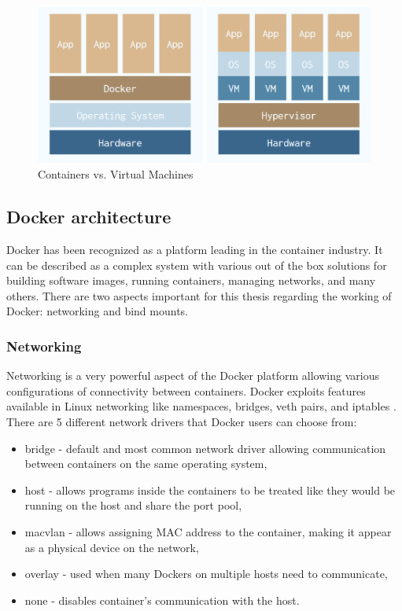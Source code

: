 \documentclass[english]{kththesis}
\begin{document}
\begin{figure}[!ht]
  \centering
    \includegraphics[width=1\textwidth]{Fig2}
  \caption{Containers vs. Virtual Machines}
  \label{fig:containerVM}
\end{figure}

\subsection{Docker architecture}
Docker has been recognized as a platform leading in the container industry. It can be described as a complex system with various out of the box solutions for building software images, running containers, managing networks, and many others. There are two aspects important for this thesis regarding the working of Docker: networking and bind mounts.

\subsubsection{Networking}
Networking is a very powerful aspect of the Docker platform allowing various configurations of connectivity between containers. Docker exploits features available in Linux networking like namespaces, bridges, veth pairs, and iptables \cite{docker_networking}. There are 5 different network drivers that Docker users can choose from:
\begin{itemize}
    \item bridge - default and most common network driver allowing communication between containers on the same operating system,
    \item host - allows programs inside the containers to be treated like they would be running on the host and share the port pool,
    \item macvlan - allows assigning MAC address to the container, making it appear as a physical device on the network,
    \item overlay - used when many Dockers on multiple hosts need to communicate,
    \item none - disables container's communication with the host.
\end{itemize}
\end{document}
